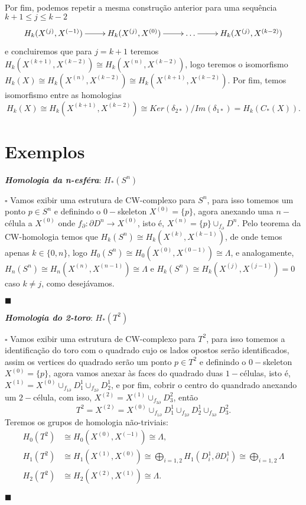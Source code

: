 \documentclass[12pt]{book}
\newcommand{\celula}[2]{D^{#1}_{#2}}
\newcommand{\celulabordo}[2]{\partial D^{#1}_{#2}}
\newcommand{\skeleton}[1]{X^{(#1)}}
\newcommand{\homologia}[2]{H_{#1}(#2)}
\newcommand{\homologiarel}[3]{H_{#1}(#2,#3)}
\newcommand{\homologiarelcel}[3]{H_{#1}(D^{#2}_{#3}, \partial D^{#2}_{#3})}
\newcommand{\homologiarelskele}[3]{H_{#1}(X^{(#2)}, X^{(#3)})}
\newcommand{\homologiarelskelesimpl}[2]{H_{#1}(X^{(#2)}, X^{(#2-1)})}
\newcommand{\somadir}[1]{\bigoplus \limits_{#1}}
\newcommand{\tese}[3]{\vspace{2mm} \textit{\textbf{#1}}: \textit{#2} \par $\square$ #3 \par $\blacksquare$}
\begin{document}
{	\vspace{2mm} Por fim, podemos repetir a mesma construção anterior para uma sequência $k+1 \leq j \leq k-2$
	\[
	\xymatrix{
		\homologiarel{k}{\skeleton{j}}{\skeleton{-1}}\ar[r]& \homologiarel{k}{\skeleton{j}}{\skeleton{0}} \ar[r] & \dots \ar[r] & \homologiarel{k}{\skeleton{j}}{\skeleton{k-2}}
	}
	\]
	e concluiremos que para $j = k+1$ teremos $\homologiarel{k}{\skeleton{k+1}}{\skeleton{k-2}} \cong \homologiarel{k}{\skeleton{n}}{\skeleton{k-2}}$, logo teremos o isomorfismo $\homologia{k}{X} \cong \homologiarel{k}{\skeleton{n}}{\skeleton{k-2}} \cong \homologiarel{k}{\skeleton{k+1}}{\skeleton{k-2}}$. Por fim, temos isomorfismo entre as homologias 
	$$
	\homologia{k}{X} \cong \homologiarel{k}{\skeleton{k+1}}{\skeleton{k-2}} \cong Ker(\delta_{2*})/Im(\delta_{1*}) = \homologia{k}{C_{*}(X)}.
	$$
	}
	
	\section{Exemplos}
	\tese{Homologia da n-esféra}{$\homologia{*}{S^{n}}$}{Vamos exibir uma estrutura de CW-complexo para $S^{n}$, para isso tomemos um ponto $p \in S^{n}$ e definindo o $0-$skeleton $\skeleton{0}=\{p\}$, agora anexando uma $n-$célula a $\skeleton{0}$ onde $f_{\partial}: \celulabordo{n}{} \to \skeleton{0}$, isto é, $\skeleton{n} = \{p\}\cup_{f_{\partial}} \celula{n}{}$. Pelo teorema da CW-homologia temos que $\homologia{k}{S^{n}} \cong \homologiarelskelesimpl{k}{k}$, de onde temos apenas $k \in \{0,n\}$, logo $\homologia{0}{S^{n}} \cong \homologiarelskelesimpl{0}{0} \cong \Lambda$, e analogamente, $\homologia{n}{S^{n}} \cong \homologiarelskelesimpl{n}{n} \cong \Lambda$ e $\homologia{k}{S^{n}} \cong \homologiarelskelesimpl{k}{j} =0$ caso $k \neq j$, como desejávamos.}
	
	\tese{Homologia do 2-toro}{$\homologia{*}{T^{2}}$}{
	Vamos exibir uma estrutura de CW-complexo para $T^{2}$, para isso tomemos a identificação do toro com o quadrado cujo os lados opostos serão identificados, assim os vertices do quadrado serão um ponto $p \in T^{2}$ e definindo o $0-$skeleton $\skeleton{0} = \{p\}$, agora vamos anexar às faces do quadrado duas $1-$células, isto é, $\skeleton{1} = \skeleton{0}\cup_{f_{1\partial}}\celula{1}{1}\cup_{f_{2\partial}}\celula{1}{2}$, e por fim, cobrir o centro do quandrado anexando um $2-$célula, com isso, $\skeleton{2} = \skeleton{1}\cup_{f_{3\partial}}\celula{2}{3}$, então
	$$
	T^{2} =\skeleton{2} = \skeleton{0}\cup_{f_{1\partial}}\celula{1}{1}\cup_{f_{2\partial}}\celula{1}{2}\cup_{f_{3\partial}}\celula{2}{3}.
	$$
	Teremos os grupos de homologia não-triviais:
	$$
	\begin{aligned}
	\homologia{0}{T^{2}} &\cong \homologiarelskele{0}{0}{-1} \cong \Lambda,
	\\
	\homologia{1}{T^{2}} &\cong \homologiarelskele{1}{1}{0} \cong \somadir{i=1,2}\homologiarelcel{1}{1}{i} \cong \somadir{i=1,2}\Lambda
	\\
	\homologia{2}{T^{2}} &\cong \homologiarelskele{2}{2}{1} \cong \Lambda.
	\end{aligned}
	$$
	}
	
\end{document}
